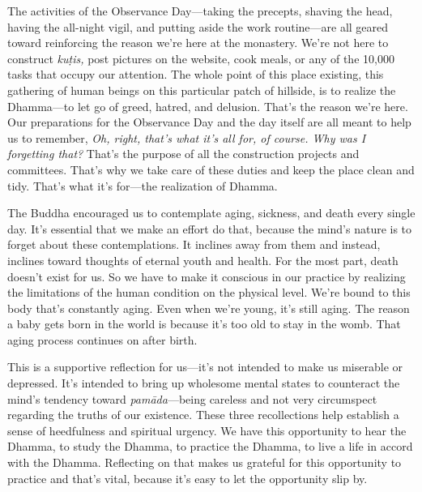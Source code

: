 The activities of the Observance Day---taking the precepts, shaving the 
head, having the all-night vigil, and putting aside the work 
routine---are all geared toward reinforcing the reason we're here at 
the monastery. We're not here to construct \emph{kuṭis,} post 
pictures on the website, cook meals, or any of the 10,000 tasks that 
occupy our attention. The whole point of this place existing, this 
gathering of human beings on this particular patch of hillside, is to 
realize the Dhamma---to let go of greed, hatred, and delusion. That's 
the reason we're here. Our preparations for the Observance Day and the 
day itself are all meant to help us to remember, \emph{Oh, right, 
that's what it's all for, of course. Why was I forgetting that?} That's 
the purpose of all the construction projects and committees. That's why 
we take care of these duties and keep the place clean and tidy. That's 
what it's for---the realization of Dhamma.


The Buddha encouraged us to contemplate aging, sickness, and death 
every single day. It's essential that we make an effort do that, 
because the mind's nature is to forget about these contemplations. It 
inclines away from them and instead, inclines toward thoughts of 
eternal youth and health. For the most part, death doesn't exist for 
us. So we have to make it conscious in our practice by realizing the 
limitations of the human condition on the physical level. We're bound 
to this body that's constantly aging. Even when we're young, it's still 
aging. The reason a baby gets born in the world is because it's too old 
to stay in the womb. That aging process continues on after birth.

This is a supportive reflection for us---it's not intended to make us 
miserable or depressed. It's intended to bring up wholesome mental 
states to counteract the mind's tendency toward \emph{pamāda}---being 
careless and not very circumspect regarding the truths of our 
existence. These three recollections help establish a sense of 
heedfulness and spiritual urgency. We have this opportunity to hear the 
Dhamma, to study the Dhamma, to practice the Dhamma, to live a life in 
accord with the Dhamma. Reflecting on that makes us grateful for this 
opportunity to practice and that's vital, because it's easy to let the 
opportunity slip by.


